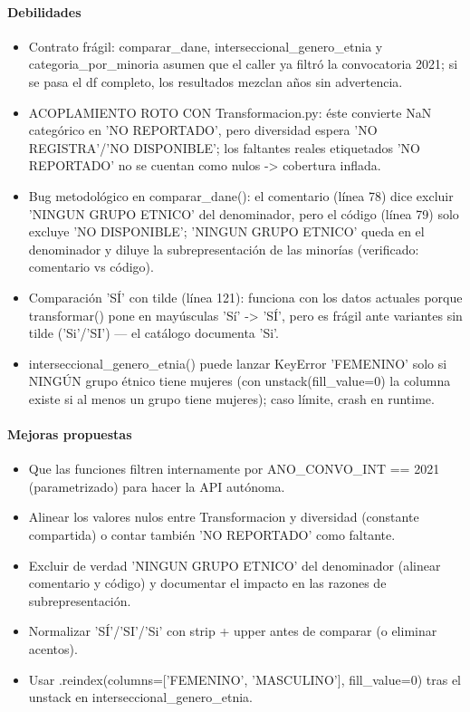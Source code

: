 \paragraph{Debilidades}
\begin{itemize}
  \item Contrato frágil: comparar\_dane, interseccional\_genero\_etnia y categoria\_por\_minoria asumen que el caller ya filtró la convocatoria 2021; si se pasa el df completo, los resultados mezclan años sin advertencia.
  \item ACOPLAMIENTO ROTO CON Transformacion.py: éste convierte NaN categórico en 'NO REPORTADO', pero diversidad espera 'NO REGISTRA'/'NO DISPONIBLE'; los faltantes reales etiquetados 'NO REPORTADO' no se cuentan como nulos -> cobertura inflada.
  \item Bug metodológico en comparar\_dane(): el comentario (línea 78) dice excluir 'NINGUN GRUPO ETNICO' del denominador, pero el código (línea 79) solo excluye 'NO DISPONIBLE'; 'NINGUN GRUPO ETNICO' queda en el denominador y diluye la subrepresentación de las minorías (verificado: comentario vs código).
  \item Comparación 'SÍ' con tilde (línea 121): funciona con los datos actuales porque transformar() pone en mayúsculas 'Sí' -> 'SÍ', pero es frágil ante variantes sin tilde ('Si'/'SI') --- el catálogo documenta 'Si'.
  \item interseccional\_genero\_etnia() puede lanzar KeyError 'FEMENINO' solo si NINGÚN grupo étnico tiene mujeres (con unstack(fill\_value=0) la columna existe si al menos un grupo tiene mujeres); caso límite, crash en runtime.
\end{itemize}

\paragraph{Mejoras propuestas}
\begin{itemize}
  \item Que las funciones filtren internamente por ANO\_CONVO\_INT == 2021 (parametrizado) para hacer la API autónoma.
  \item Alinear los valores nulos entre Transformacion y diversidad (constante compartida) o contar también 'NO REPORTADO' como faltante.
  \item Excluir de verdad 'NINGUN GRUPO ETNICO' del denominador (alinear comentario y código) y documentar el impacto en las razones de subrepresentación.
  \item Normalizar 'SÍ'/'SI'/'Si' con strip + upper antes de comparar (o eliminar acentos).
  \item Usar .reindex(columns=['FEMENINO', 'MASCULINO'], fill\_value=0) tras el unstack en interseccional\_genero\_etnia.
\end{itemize}

